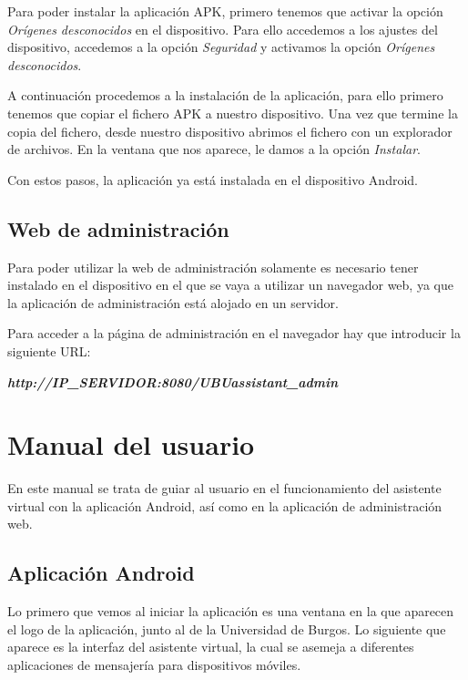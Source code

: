 Para poder instalar la aplicación APK, primero tenemos que activar la opción \textit{Orígenes desconocidos} en el dispositivo. Para ello accedemos a los ajustes del dispositivo, accedemos a la opción \textit{Seguridad} y activamos la opción \textit{Orígenes desconocidos}.


A continuación procedemos a la instalación de la aplicación, para ello primero tenemos que copiar el fichero APK a nuestro dispositivo. Una vez que termine la copia del fichero, desde nuestro dispositivo abrimos el fichero con un explorador de archivos. En la ventana que nos aparece, le damos a la opción \textit{Instalar}.


Con estos pasos, la aplicación ya está instalada en el dispositivo Android.

\subsection{Web de administración}

Para poder utilizar la web de administración solamente es necesario tener instalado en el dispositivo en el que se vaya a utilizar un navegador web, ya que la aplicación de administración está alojado en un servidor.

Para acceder a la página de administración en el navegador hay que introducir la siguiente URL:

\begin{center}
	\textit{\textbf{http://IP\_SERVIDOR:8080/UBUassistant\_admin}}
\end{center}

\section{Manual del usuario}

En este manual se trata de guiar al usuario en el funcionamiento del asistente virtual con la aplicación Android, así como en la aplicación de administración web.

\subsection{Aplicación Android}

Lo primero que vemos al iniciar la aplicación es una ventana en la que aparecen el logo de la aplicación, junto al de la Universidad de Burgos. Lo siguiente que aparece es la interfaz del asistente virtual, la cual se asemeja a diferentes aplicaciones de mensajería para dispositivos móviles.


